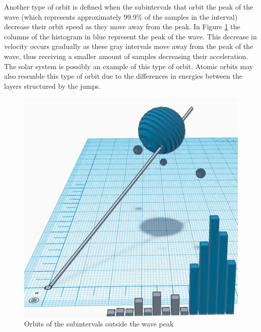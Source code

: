 Another type of orbit is defined when the subintervals that orbit the peak of the wave (which represents approximately 99.9\% of the samples in the interval) decrease their orbit speed as they move away from the peak. In Figure \ref{fig:consciousness_elliptical_orbit_system} the columns of the histogram in blue represent the peak of the wave. This decrease in velocity occurs gradually as these gray intervals move away from the peak of the wave, thus receiving a smaller amount of samples decreasing their acceleration. The solar system is possibly an example of this type of orbit. Atomic orbits may also resemble this type of orbit due to the differences in energies between the layers structured by the jumps.  
	\begin{figure}[H]
	\caption{Orbits of the subintervals outside the wave peak}
	\label{fig:consciousness_elliptical_orbit_system}
	\centering
	\includegraphics[scale=.7]{sections/images/consciousness_elliptical_orbit_system.jpg}
	\end{figure}

